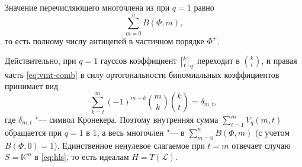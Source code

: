 \documentclass[a4paper,14pt,oneside,openany]{memoir}
\begin{document}
\begin{remark}\label{remark:N-at-q1-antichains}
    Значение перечисляющего многочлена из  при
    $q = 1$ равно
    \[
        \sum_{m=0}^n B(\Phi, m),
    \]
    то есть полному числу антицепей в частичном порядке $\Phi^+$.

    Действительно, при $q = 1$ гауссов коэффициент $\qbinom{k}{t}$ переходит в
    $\binom{k}{t}$, и правая часть \eqref{eq:vmt-comb} в силу ортогональности
    биномиальных коэффициентов принимает вид
    \[
        \sum_{k=t}^{m} (-1)^{m-k} \binom{m}{k} \binom{k}{t} = \delta_{m, t},
    \]
    где $\delta_{m, t}$ "--- символ Кронекера. Поэтому внутренняя сумма
    $\sum_{t=1}^{m} V_q(m, t)$ обращается при $q = 1$ в $1$, а весь многочлен "---
    в $\sum_{m=0}^n B(\Phi, m)$ (с учетом $B(\Phi, 0) = 1$). Единственное ненулевое
    слагаемое при $t = m$ отвечает случаю $S = \mathbb{K}^m$ в \eqref{eq:hls}, то
    есть идеалам $H = T(\mathcal{L})$.
\end{remark}
\end{document}
